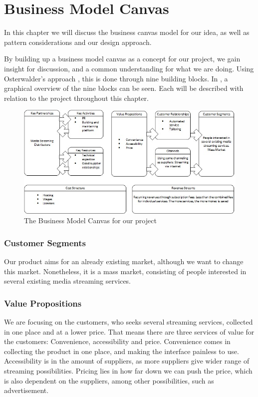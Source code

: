 \section{Business Model Canvas}
\label{sec:business_canvas}
In this chapter we will discuss the business canvas model for our idea, as well as pattern considerations and our design approach.

By building up a business model canvas as a concept for our project, we gain insight for discussion, and a common understanding for what we are doing. Using Osterwalder's approach \cite[p. 1-51]{canvas}, this is done through nine building blocks. In , a graphical overview of the nine blocks can be seen. Each will be described with relation to the project throughout this chapter.

\begin{figure}[h]
    \begin{center}
        \includegraphics[scale=0.8]{./pics/model_canvas}
        \caption{The Business Model Canvas for our project}
        \label{fig:model_canvas}
    \end{center}
\end{figure}


\subsubsection*{Customer Segments}
Our product aims for an already existing market, although we want to change this market. Nonetheless, it is a mass market, consisting of people interested in several existing media streaming services.

\subsubsection*{Value Propositions}
We are focusing on the customers, who seeks several streaming services, collected in one place and at a lower price. That means there are three services of value for the customers: Convenience, accessibility and price. Convenience comes in collecting the product in one place, and making the interface painless to use. Accessibility is in the amount of suppliers, as more suppliers give wider range of streaming possibilities. Pricing lies in how far down we can push the price, which is also dependent on the suppliers, among other possibilities, such as advertisement.

